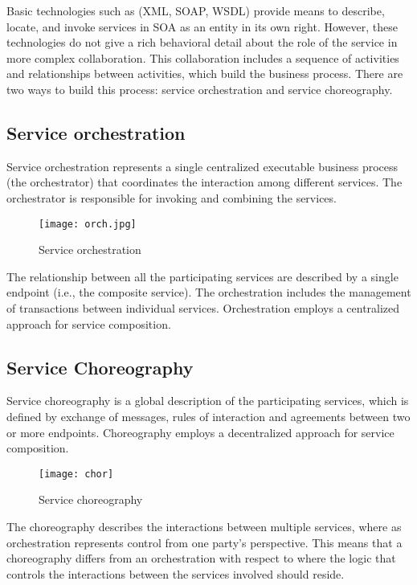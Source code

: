 Basic technologies such as (XML, SOAP, WSDL) provide means to describe, locate,
and invoke services in SOA as an entity in its own right. However, these technologies
do not give a rich behavioral detail about the role of the service in more
complex collaboration. This collaboration includes a sequence of activities and
relationships between activities, which build the business process. There are
two ways to build this process: service orchestration and service choreography.

\subsection{Service orchestration}

Service orchestration represents a single centralized executable business
process (the orchestrator) that coordinates the interaction among different
services. The orchestrator is responsible for invoking and combining the
services.

\begin{figure}[h]
  \centering
  \texttt{[image: orch.jpg]}
  \caption{Service orchestration}
\label{fig:orch}
\end{figure}

The relationship between all the participating services are described by a
single endpoint (i.e., the composite service). The orchestration includes the
management of transactions between individual services. Orchestration employs a
centralized approach for service composition.

\subsection{Service Choreography}

Service choreography is a global description of the participating services,
which is defined by exchange of messages, rules of interaction and agreements
between two or more endpoints. Choreography employs a decentralized approach for
service composition.

\begin{figure}[h]
  \centering
  \texttt{[image: chor]}
  \caption{Service choreography}
\label{fig:chor}
\end{figure}

The choreography describes the interactions between multiple services, where as
orchestration represents control from one party's perspective. This means that a
choreography differs from an orchestration with respect to where the logic that
controls the interactions between the services involved should reside.

